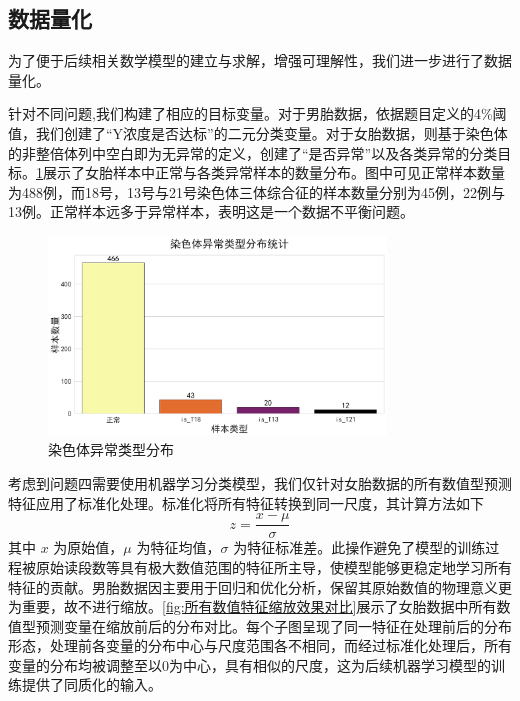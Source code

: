 \subsection{数据量化}
为了便于后续相关数学模型的建立与求解，增强可理解性，我们进一步进行了数据量化。

针对不同问题,我们构建了相应的目标变量。对于男胎数据，依据题目定义的4\%阈值，我们创建了“Y浓度是否达标”的二元分类变量。对于女胎数据，则基于染色体的非整倍体列中空白即为无异常的定义，创建了“是否异常”以及各类异常的分类目标。\cref{fig:染色体异常类型分布}展示了女胎样本中正常与各类异常样本的数量分布。图中可见正常样本数量为488例，而18号，13号与21号染色体三体综合征的样本数量分别为45例，22例与13例。正常样本远多于异常样本，表明这是一个数据不平衡问题。

\begin{figure}[h!]
\centering
\includegraphics[width=0.8\textwidth]{figs/2模型准备/图5_染色体异常类型分布.png}
\caption{染色体异常类型分布}
\label{fig:染色体异常类型分布}
\end{figure}

考虑到问题四需要使用机器学习分类模型，我们仅针对女胎数据的所有数值型预测特征应用了标准化处理。标准化将所有特征转换到同一尺度，其计算方法如下
\begin{equation}
z = \frac{x - \mu}{\sigma}
\label{eq:standardization}
\end{equation}
其中 $x$ 为原始值，$\mu$ 为特征均值，$\sigma$ 为特征标准差。此操作避免了模型的训练过程被原始读段数等具有极大数值范围的特征所主导，使模型能够更稳定地学习所有特征的贡献。男胎数据因主要用于回归和优化分析，保留其原始数值的物理意义更为重要，故不进行缩放。\cref{fig:所有数值特征缩放效果对比}展示了女胎数据中所有数值型预测变量在缩放前后的分布对比。每个子图呈现了同一特征在处理前后的分布形态，处理前各变量的分布中心与尺度范围各不相同，而经过标准化处理后，所有变量的分布均被调整至以0为中心，具有相似的尺度，这为后续机器学习模型的训练提供了同质化的输入。

